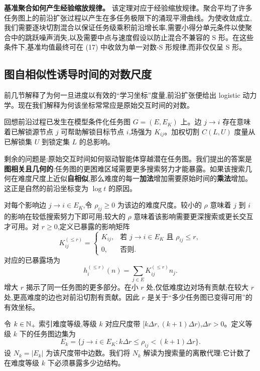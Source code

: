 \textbf{基准聚合如何产生经验缩放规律。} 该定理对应于经验缩放规律。聚合平均了许多任务图上的前沿扩张过程以产生在多任务极限下的涌现平滑曲线。为使收敛成立,我们需要逐块切割混合以保证任务级乘积前沿增长率,需要小得分单元条件以使聚合中的跳跃噪声消失,以及需要中点与速度假设以防止混合不兼容的 S 形。在这些条件下,基准均值最终可在 (17) 中收敛为单一对数-S 形规律,而非仅仅呈 S 形。

\subsection{图自相似性诱导时间的对数尺度}
\label{app:selfsim}

前几节解释了为何一旦进度以有效的``学习坐标''度量,前沿扩张便给出 logistic 动力学。现在我们解释为何该坐标常常应是原始交互时间的对数。

回想前沿过程已发生在模型条件化任务图 $G = (E, E_{K})$ 上。边 $j \to i$ 存在意味着已解锁源节点 $j$ 可帮助解锁目标节点 $i$,场强为 $K_{ij}$。加权切割 $C(L, U)$ 度量从已解锁集 $U$ 到锁定集 $L$ 的总影响。

剩余的问题是:原始交互时间如何驱动智能体穿越潜在任务图。我们提出的答案是\textbf{图相关且几何的}:任务图的更困难区域需要更多搜索努力才能暴露。如果该搜索几何在难度尺度上近似\textbf{自相似},那么难度的每一\textbf{加法}增加需要原始时间的\textbf{乘法}增加。这正是自然的前沿坐标变为 $\log t$ 的原因。

\begin{definition}[任务图边上的难度尺度]
对每个影响边 $j \to i \in E_{K}$,令 $\rho_{ij} \geq 0$ 为该边的难度尺度。较小的 $\rho$ 意味着 $j$ 到 $i$ 的影响在较低搜索努力下即可用;较大的 $\rho$ 意味着该影响需要更深搜索或更长交互才可用。对 $r \geq 0$,定义已暴露的影响矩阵
\[
    K^{(\leq r)}_{ij} = \begin{cases} K_{ij}, & \text{若 } j \to i \in E_{K} \text{ 且 } \rho_{ij} \leq r, \\ 0, & \text{否则}. \end{cases}
\]
对应的已暴露场为
\[
    h^{(\leq r)}_{i}(n) = \sum_{j \in E} K^{(\leq r)}_{ij} n_{j}.
\]
增大 $r$ 揭示了同一任务图的更多部分。在小 $r$ 处,仅低难度边对场有贡献;在较大 $r$ 处,更高难度的边也对前沿切割有贡献。因此 $r$ 是关于``多少任务图已变得可用''的有效坐标。
\end{definition}

\begin{definition}[难度尺度下的搜索量]
令 $k \in \mathbb{N}_{+}$ 索引难度等级,等级 $k$ 对应尺度带 $[k \Delta r, (k+1) \Delta r)$,$\Delta r > 0$。定义等级 $k$ 下的任务图边集为
\[
    E_{k} = \{j \to i \in E_{K} : k \Delta r \leq \rho_{ij} < (k+1) \Delta r\}.
\]
设 $N_{k} = |E_{k}|$ 为该尺度带中边数。我们将 $N_{k}$ 解读为搜索量的离散代理:它计数了在难度等级 $k$ 下必须暴露多少边结构。
\end{definition}

